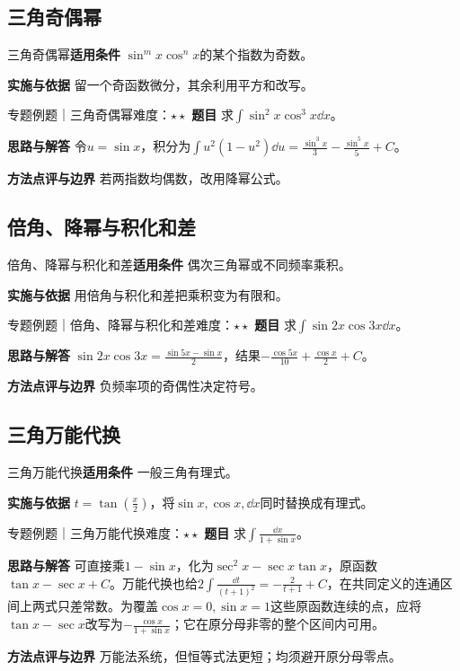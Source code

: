 \subsection{三角奇偶幂}\label{mat:integrals_methods:i10}
\begin{method}{三角奇偶幂}\textbf{适用条件} $\sin^mx\cos^nx$的某个指数为奇数。\par\textbf{实施与依据} 留一个奇函数微分，其余利用平方和改写。\end{method}
\begin{example}{专题例题｜三角奇偶幂}{难度：$\star\star$}
\textbf{题目} 求$\int\sin^2x\cos^3x\dd x$。\par\textbf{思路与解答} 令$u=\sin x$，积分为$\int u^2(1-u^2)\dd u=\frac{\sin^3x}{3}-\frac{\sin^5x}{5}+C$。\par\textbf{方法点评与边界} 若两指数均偶数，改用降幂公式。
\end{example}
\subsection{倍角、降幂与积化和差}\label{mat:integrals_methods:i11}
\begin{method}{倍角、降幂与积化和差}\textbf{适用条件} 偶次三角幂或不同频率乘积。\par\textbf{实施与依据} 用倍角与积化和差把乘积变为有限和。\end{method}
\begin{example}{专题例题｜倍角、降幂与积化和差}{难度：$\star\star$}
\textbf{题目} 求$\int\sin2x\cos3x\dd x$。\par\textbf{思路与解答} $\sin2x\cos3x=\frac{\sin5x-\sin x}{2}$，结果$-\frac{\cos5x}{10}+\frac{\cos x}{2}+C$。\par\textbf{方法点评与边界} 负频率项的奇偶性决定符号。
\end{example}
\subsection{三角万能代换}\label{mat:integrals_methods:i12}
\begin{method}{三角万能代换}\textbf{适用条件} 一般三角有理式。\par\textbf{实施与依据} $t=\tan(\frac{x}{2})$，将$\sin x,\cos x,\dd x$同时替换成有理式。\end{method}
\begin{example}{专题例题｜三角万能代换}{难度：$\star\star$}
\textbf{题目} 求$\int\frac{\dd x}{1+\sin x}$。\par\textbf{思路与解答} 可直接乘$1-\sin x$，化为$\sec^2x-\sec x\tan x$，原函数$\tan x-\sec x+C$。万能代换也给$2\int\frac{\dd t}{(t+1)^2}=-\frac{2}{t+1}+C$，在共同定义的连通区间上两式只差常数。为覆盖$\cos x=0,\sin x=1$这些原函数连续的点，应将$\tan x-\sec x$改写为$-\frac{\cos x}{1+\sin x}$；它在原分母非零的整个区间内可用。\par\textbf{方法点评与边界} 万能法系统，但恒等式法更短；均须避开原分母零点。
\end{example}
